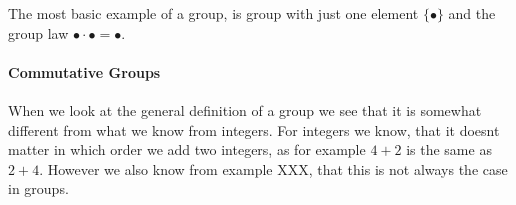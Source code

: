 \begin{example}
The most basic example of a group, is group with just one element $\{\bullet\}$ and the group law $\bullet\cdot \bullet=\bullet$. 
\end{example}
\paragraph{Commutative Groups} When we look at the general definition of a group we see that it is somewhat different from what we know from integers. For integers we know, that it doesnt matter in which order we add two integers, as for example $4+2$ is the same as $2+4$. However we also know from example XXX, that this is not always the case in groups. 


